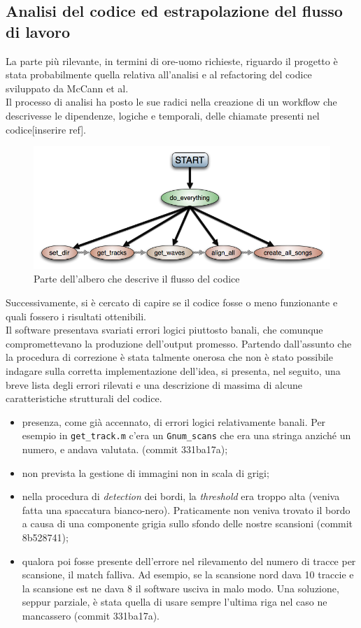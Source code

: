 \subsection{Analisi del codice ed estrapolazione del flusso di lavoro}
La parte più rilevante, in termini di ore-uomo richieste, riguardo il
progetto è stata probabilmente quella relativa all'analisi e al refactoring
del codice sviluppato da McCann et al. \\
Il processo di analisi ha posto le sue radici nella creazione di un 
workflow che descrivesse le dipendenze, logiche e temporali, delle chiamate
presenti nel codice[inserire ref]. 
\begin{figure}[h!t]
\begin{center}
\includegraphics[scale=0.3]{./img/workflow.png}
\caption{Parte dell'albero che descrive il flusso del codice}\label{fading}
\end{center}
\end{figure}
Successivamente, si è cercato di capire 
se il codice fosse o meno funzionante e quali fossero i risultati 
ottenibili. \\
Il software presentava svariati errori logici piuttosto banali, che 
comunque compromettevano la produzione dell'output promesso. Partendo
dall'assunto che la procedura di correzione è stata talmente
onerosa che non è stato possibile indagare sulla corretta implementazione
dell'idea, si presenta, nel seguito, una breve lista degli errori rilevati e una 
descrizione di massima di alcune caratteristiche strutturali del codice.

\begin{itemize}
\item presenza, come già accennato, di errori logici relativamente banali. 
Per esempio in \texttt{get\_track.m} c'era un \texttt{Gnum\_scans} che era 
una stringa anzich\'e un numero, e andava valutata. (commit 331ba17a);
\item non prevista la gestione di immagini non in scala di grigi;
\item nella procedura di \emph{detection} dei bordi, la
\emph{threshold} era troppo alta (veniva fatta una spaccatura bianco-nero). 
Praticamente non veniva trovato il bordo a causa di una componente
grigia sullo sfondo delle nostre scansioni (commit 8b528741);
\item qualora poi fosse presente dell'errore nel rilevamento del numero 
di tracce 
per scansione, il match falliva. Ad esempio, se la scansione nord 
dava 10 traccie e la scansione est ne dava 8 il software usciva in malo
modo. Una soluzione, seppur parziale, è stata quella di usare 
sempre l'ultima riga nel caso ne mancassero (commit 331ba17a).
\end{itemize}

